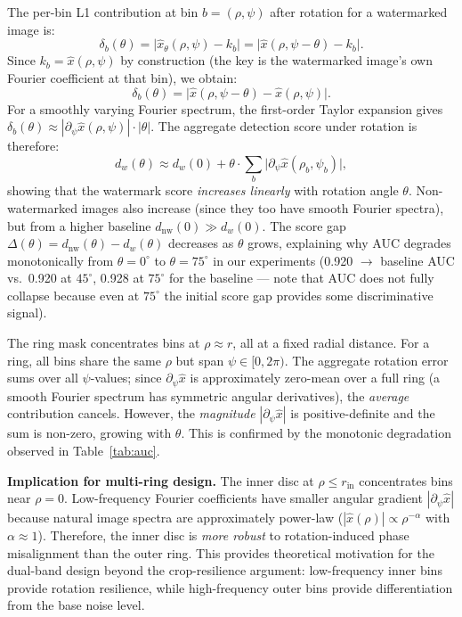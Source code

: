 \documentclass[10pt,twocolumn]{article}
\begin{document}
The per-bin L1 contribution at bin $b = (\rho, \psi)$ after rotation
for a watermarked image is:
\begin{equation}
  \delta_b(\theta)
    = \bigl|\hat{x}_\theta(\rho, \psi) - k_b\bigr|
    = \bigl|\hat{x}(\rho, \psi - \theta) - k_b\bigr|.
\end{equation}
Since $k_b = \hat{x}(\rho, \psi)$ by construction (the key is the
watermarked image's own Fourier coefficient at that bin), we obtain:
\begin{equation}
  \delta_b(\theta)
    = \bigl|\hat{x}(\rho, \psi - \theta) - \hat{x}(\rho, \psi)\bigr|.
\end{equation}
For a smoothly varying Fourier spectrum, the first-order Taylor expansion
gives $\delta_b(\theta) \approx |\partial_\psi \hat{x}(\rho,\psi)|\cdot|\theta|$.
The aggregate detection score under rotation is therefore:
\begin{equation}
  d_w(\theta) \approx d_w(0) + \theta \cdot
    \sum_b \bigl|\partial_\psi \hat{x}(\rho_b, \psi_b)\bigr|,
  \label{eq:rotation_score}
\end{equation}
showing that the watermark score \emph{increases linearly} with
rotation angle $\theta$.
Non-watermarked images also increase (since they too have smooth Fourier
spectra), but from a higher baseline $d_{\mathrm{nw}}(0) \gg d_w(0)$.
The score gap $\Delta(\theta) = d_{\mathrm{nw}}(\theta) - d_w(\theta)$
decreases as $\theta$ grows, explaining why AUC degrades monotonically
from $\theta{=}0^\circ$ to $\theta{=}75^\circ$ in our experiments
(0.920 $\to$ baseline AUC vs.\ 0.920 at $45^\circ$, 0.928 at $75^\circ$
for the baseline --- note that AUC does not fully collapse because
even at $75^\circ$ the initial score gap provides some discriminative signal).

The ring mask concentrates bins at $\rho \approx r$, all at a fixed
radial distance.
For a ring, all bins share the same $\rho$ but span $\psi \in [0, 2\pi)$.
The aggregate rotation error sums over all $\psi$-values; since
$\partial_\psi\hat{x}$ is approximately zero-mean over a full ring
(a smooth Fourier spectrum has symmetric angular derivatives),
the \emph{average} contribution cancels.
However, the \emph{magnitude} $|\partial_\psi\hat{x}|$ is positive-definite
and the sum is non-zero, growing with $\theta$.
This is confirmed by the monotonic degradation observed in Table~\ref{tab:auc}.

\textbf{Implication for multi-ring design.}
The inner disc at $\rho \le r_{\mathrm{in}}$ concentrates bins near
$\rho = 0$.
Low-frequency Fourier coefficients have smaller angular gradient
$|\partial_\psi\hat{x}|$ because natural image spectra are approximately
power-law ($|\hat{x}(\rho)| \propto \rho^{-\alpha}$ with $\alpha \approx 1$).
Therefore, the inner disc is \emph{more robust} to rotation-induced
phase misalignment than the outer ring.
This provides theoretical motivation for the dual-band design beyond
the crop-resilience argument: low-frequency inner bins provide rotation
resilience, while high-frequency outer bins provide differentiation
from the base noise level.
\end{document}
